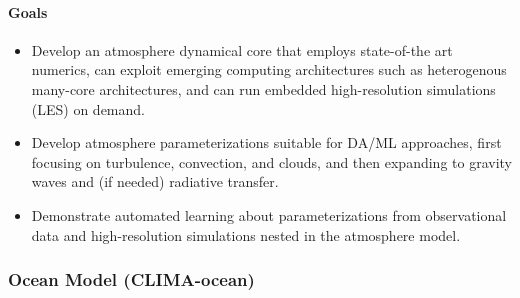 \documentclass{article}
\begin{document}
\paragraph{Goals}
\begin{itemize}
    \item Develop an atmosphere dynamical core that employs state-of-the art numerics, can exploit emerging computing architectures such as heterogenous many-core architectures, and can run embedded high-resolution simulations (LES) on demand.
    \item Develop atmosphere parameterizations suitable for DA/ML approaches, first focusing on turbulence, convection, and clouds, and then expanding to gravity waves and (if needed) radiative transfer.
    \item Demonstrate automated learning about parameterizations from observational data and high-resolution simulations nested in the atmosphere model.
\end{itemize}

\subsubsection{Ocean Model (CLIMA-ocean)}
\end{document}
